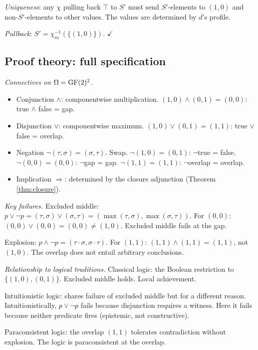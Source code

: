 \emph{Uniqueness}: any $\chi$ pulling back $\top$ to $S'$
must send $S'$-elements to $(1,0)$ and non-$S'$-elements
to other values. The values are determined by $d$'s profile.

\emph{Pullback}: $S' = \chi_m^{-1}(\{(1,0)\})$. $\checkmark$

\subsection{Proof theory: full specification}
\label{app:proof-theory-full}

\emph{Connectives on $\Omega = \operatorname{GF}(2)^2$.}
\begin{itemize}[nosep]
  \item Conjunction $\wedge$: componentwise multiplication.
    $(1,0) \wedge (0,1) = (0,0)$: true $\wedge$ false = gap.
  \item Disjunction $\vee$: componentwise maximum.
    $(1,0) \vee (0,1) = (1,1)$: true $\vee$ false = overlap.
  \item Negation $\neg(\tau,\sigma) = (\sigma,\tau)$. Swap.
    $\neg(1,0) = (0,1)$: $\neg$true = false. $\neg(0,0) = (0,0)$:
    $\neg$gap = gap. $\neg(1,1) = (1,1)$: $\neg$overlap = overlap.
  \item Implication $\Rightarrow$: determined by the closure
    adjunction (Theorem \ref{thm:closure}).
\end{itemize}

\emph{Key failures.}
Excluded middle: $p \vee \neg p = (\tau,\sigma) \vee
(\sigma,\tau) = (\max(\tau,\sigma), \max(\sigma,\tau))$.
For $(0,0)$: $(0,0) \vee (0,0) = (0,0) \neq (1,0)$.
Excluded middle fails at the gap.

Explosion: $p \wedge \neg p = (\tau \cdot \sigma,
\sigma \cdot \tau)$. For $(1,1)$:
$(1,1) \wedge (1,1) = (1,1)$, not $(1,0)$. The overlap
does not entail arbitrary conclusions.

\emph{Relationship to logical traditions.}
Classical logic: the Boolean restriction to
$\{(1,0), (0,1)\}$. Excluded middle holds. Local
achievement.

Intuitionistic logic: shares failure of excluded middle
but for a different reason. Intuitionistically,
$p \vee \neg p$ fails because disjunction requires a
witness. Here it fails because neither predicate fires
(epistemic, not constructive).

Paraconsistent logic: the overlap $(1,1)$ tolerates
contradiction without explosion. The logic is
paraconsistent at the overlap.

